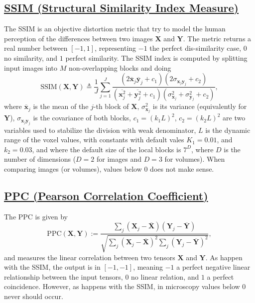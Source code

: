 \documentclass{article}
\begin{document}
\subsection{\href{https://en.wikipedia.org/wiki/Structural_similarity_index_measure}{SSIM
    (Structural Similarity Index Measure)}}
The SSIM is an objective distortion metric that try to model the human
perception of the differences between two images $\mathbf{X}$ and
$\mathbf{Y}$. The metric returns a real number between $[-1, 1]$,
representing $-1$ the perfect dis-similarity case, $0$ no similarity,
and $1$ perfect similarity. The SSIM index is computed by splitting
input images into $M$ non-overlapping blocks and doing
\begin{equation}
  \text{SSIM}(\mathbf{X}, \mathbf{Y}) \triangleq \frac{1}{J} \sum_{j=1}^J \frac{(2\overline{\mathbf{x}}_j \overline{\mathbf{y}}_j + c_1)(2\sigma_{\mathbf{x}_j \mathbf{y}_j} + c_2)}{(\overline{\mathbf{x}_j^2} + \overline{\mathbf{y}_j^2} + c_1)(\sigma^2_{\mathbf{x}_j} + \sigma^2_{\mathbf{y}_j} + c_2)},
\end{equation}
where $\overline{\mathbf x}_j$ is the mean of the $j$-th block of
$\mathbf{X}$, $\sigma^2_{\mathbf{x}_j}$ is its variance (equivalently
for $\mathbf{Y}$), $\sigma_{\mathbf{x}_j\mathbf{y}_j}$ is the
covariance of both blocks, $c_1=(k_1L)^2$, $c_2=(k_2L)^2$ are two
variables used to stabilize the division with weak denominator, $L$ is
the dynamic range of the voxel values, with constants with default
vales $K_1=0.01$, and $k_2=0.03$, and where the default size of the
local blocks is $7^D$, where $D$ is the number of dimensions ($D=2$
for images and $D=3$ for volumes). When comparing images (or volumes),
values below $0$ does not make sense.

\subsection{\href{https://en.wikipedia.org/wiki/Pearson_correlation_coefficient}{PPC
    (Pearson Correlation Coefficient)}}
The PPC is given
by
\begin{equation}
  \text{PPC}(\mathbf{X}, \mathbf{Y}) := \frac{\sum_j(\mathbf{X}_j - \overline{\mathbf{X}})(\mathbf{Y}_j - \overline{\mathbf{Y}})}{\sqrt{\sum_j (\mathbf{X}_j - \overline{\mathbf{X}})^2 \sum_j (\mathbf{Y}_j - \overline{\mathbf{Y}})^2}},
\end{equation}
and measures the linear correlation between two tensors $\mathbf{X}$
and $\mathbf{Y}$.  As happen with the SSIM, the output is in
$[-1, -1]$, meaning $-1$ a perfect negative linear relationship
between the input tensors, $0$ no linear relation, and $1$ a perfect
coincidence. However, as happens with the SSIM, in microscopy values
below $0$ never should occur.
\end{document}
